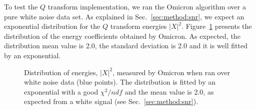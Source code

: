 To test the $Q$ transform implementation, we ran the Omicron algorithm over a pure white noise data set. As explained in Sec.~\ref{sec:method:snr}, we expect an exponential distribution for the $Q$ transform energies $|X|^2$. Figure~\ref{fig:noise_energy_gaus} presents the distribution of the energy coefficients obtained by Omicron. As expected, the distribution mean value is 2.0, the standard deviation is 2.0 and it is well fitted by an exponential.
\begin{figure}
  \center
  \caption{Distribution of energies, $|X|^2$, measured by Omicron when ran over white noise data (blue points). The distribution is fitted by an exponential with a good $\chi^2/ndf$ and the mean value is 2.0, as expected from a white signal (see Sec.~\ref{sec:method:snr}).}
  \label{fig:noise_energy_gaus}
\end{figure}



